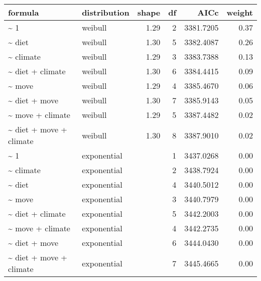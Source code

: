 \begin{table}[ht]
\centering
\begin{tabular}{llrrrr}
 formula & distribution & shape & df & AICc & weight \\ 
  \hline
\~{} 1 & weibull & 1.29 & 2 & 3381.7205 & 0.37 \\ 
  \~{} diet & weibull & 1.30 & 5 & 3382.4087 & 0.26 \\ 
  \~{} climate & weibull & 1.29 & 3 & 3383.7388 & 0.13 \\ 
  \~{} diet + climate & weibull & 1.30 & 6 & 3384.4415 & 0.09 \\ 
  \~{} move & weibull & 1.29 & 4 & 3385.4670 & 0.06 \\ 
  \~{} diet + move & weibull & 1.30 & 7 & 3385.9143 & 0.05 \\ 
  \~{} move + climate & weibull & 1.29 & 5 & 3387.4482 & 0.02 \\ 
  \~{} diet + move + climate & weibull & 1.30 & 8 & 3387.9010 & 0.02 \\ 
  \~{} 1 & exponential &  & 1 & 3437.0268 & 0.00 \\ 
  \~{} climate & exponential &  & 2 & 3438.7924 & 0.00 \\ 
  \~{} diet & exponential &  & 4 & 3440.5012 & 0.00 \\ 
  \~{} move & exponential &  & 3 & 3440.7979 & 0.00 \\ 
  \~{} diet + climate & exponential &  & 5 & 3442.2003 & 0.00 \\ 
  \~{} move + climate & exponential &  & 4 & 3442.2735 & 0.00 \\ 
  \~{} diet + move & exponential &  & 6 & 3444.0430 & 0.00 \\ 
  \~{} diet + move + climate & exponential &  & 7 & 3445.4665 & 0.00 \\ 
  \end{tabular}
\label{tab:erg}
\end{table}
